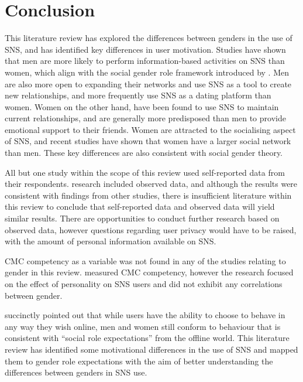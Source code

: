 \section{Conclusion}

This literature review has explored the differences between genders in the use of SNS, and has identified key differences in user motivation. Studies have shown that men are more likely to perform information-based activities on SNS than women, which align with the social gender role framework introduced by \citet{Eagly1987}. Men are also more open to expanding their networks and use SNS as a tool to create new relationships, and more frequently use SNS as a dating platform than women. Women on the other hand, have been found to use SNS to maintain current relationships, and are generally more predisposed than men to provide emotional support to their friends. Women are attracted to the socialising aspect of SNS, and recent studies have shown that women have a larger social network than men. These key differences are also consistent with social gender theory.

All but one study within the scope of this review used self-reported data from their respondents.  research included observed data, and although the results were consistent with findings from other studies, there is insufficient literature within this review to conclude that self-reported data and observed data will yield similar results. There are opportunities to conduct further research based on observed data, however questions regarding user privacy would have to be raised, with the amount of personal information available on SNS.

CMC competency as a variable was not found in any of the studies relating to gender in this review. \citet{Ross2009} measured CMC competency, however the research focused on the effect of personality on SNS users and did not exhibit any correlations between gender.

\citet[p. 897]{Kimbrough2013} succinctly pointed out that while users have the ability to choose to behave in any way they wish online, men and women still conform to behaviour that is consistent with ``social role expectations'' from the offline world. This literature review has identified some motivational differences in the use of SNS and mapped them to gender role expectations with the aim of better understanding the differences between genders in SNS use.